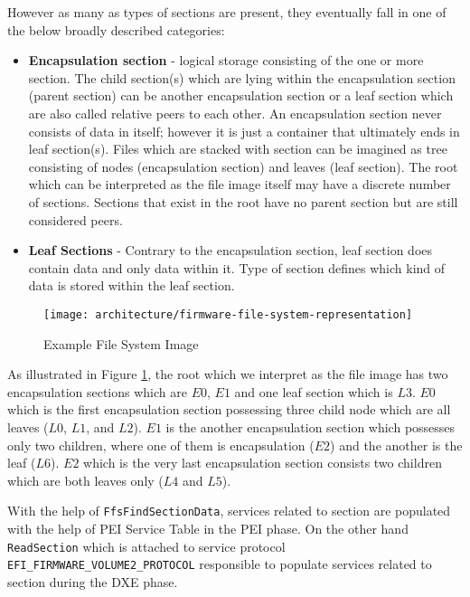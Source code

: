 However as many as types of sections are present, they eventually fall in one of the below broadly described categories:
\begin{itemize}
	\item \textbf{Encapsulation section} - logical storage consisting of the one or more section.
	The child section(s) which are lying within the encapsulation section (parent section) can be another encapsulation section or a leaf section which are also called relative peers to each other. An encapsulation section never consists of data in itself; however it is just a container that ultimately ends in leaf section(s). Files which are stacked with section can be imagined as tree consisting of nodes (encapsulation section) and	leaves (leaf section). The root which can be interpreted as the file image itself may have a discrete number of sections. Sections that exist in the root have no parent section but are still considered peers.
	
	\item \textbf{Leaf Sections} - Contrary to the encapsulation section, leaf section does contain data and only data within it. Type of section defines which kind of data is stored within the leaf section.
\end{itemize}

\begin{figure}[!htbp]
	\centering
	\texttt{[image: architecture/firmware-file-system-representation]}
	\caption{Example File System Image}\label{fig:architecture-firmware-file-system-representation}
\end{figure}

As illustrated in Figure \ref{fig:architecture-firmware-file-system-representation}, the root which we interpret as the file image has two encapsulation sections which are $ E0 $, $ E1 $ and one leaf section which is $ L3 $. $ E0 $ which is the first encapsulation section possessing three child node which are all leaves ($ L0 $, $ L1 $, and $ L2 $). $ E1 $ is the another encapsulation section which possesses only two children, where one of them is encapsulation ($ E2 $) and the another is the leaf ($ L6 $). $ E2 $ which is the very last encapsulation section consists two children which are both leaves only ($ L4 $ and $ L5 $).

With the help of \verb|FfsFindSectionData|, services related to section are populated with the help of PEI Service Table in the PEI phase. On the other hand \verb|ReadSection| which is attached to service protocol \verb|EFI_FIRMWARE_VOLUME2_PROTOCOL| responsible to populate services related to section during the DXE phase.

